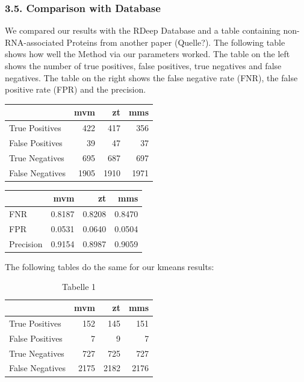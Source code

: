 \documentclass[
  12pt,
]{article}
\begin{document}
\hypertarget{comparison-with-database}{%
\subsubsection{3.5. Comparison with
Database}\label{comparison-with-database}}

We compared our results with the RDeep Database and a table containing
non-RNA-associated Proteins from another paper (Quelle?). The following
table shows how well the Method via our parameters worked. The table on
the left shows the number of true positives, false positives, true
negatives and false negatives. The table on the right shows the false
negative rate (FNR), the false positive rate (FPR) and the precision.

\begin{table}
\centering
\begin{tabular}{l|r|r|r}
\hline
  & mvm & zt & mms\\
\hline
True Positives & 422 & 417 & 356\\
\hline
False Positives & 39 & 47 & 37\\
\hline
True Negatives & 695 & 687 & 697\\
\hline
False Negatives & 1905 & 1910 & 1971\\
\hline
\end{tabular}
\end{table}

\begin{table}
\centering
\begin{tabular}{l|r|r|r}
\hline
  & mvm & zt & mms\\
\hline
FNR & 0.8187 & 0.8208 & 0.8470\\
\hline
FPR & 0.0531 & 0.0640 & 0.0504\\
\hline
Precision & 0.9154 & 0.8987 & 0.9059\\
\hline
\end{tabular}
\end{table}

The following tables do the same for our kmeans results:

\begin{table}

\caption{\label{tab:unnamed-chunk-7}Tabelle 1}
\centering
\begin{tabular}[t]{l|r|r|r}
\hline
  & mvm & zt & mms\\
\hline
True Positives & 152 & 145 & 151\\
\hline
False Positives & 7 & 9 & 7\\
\hline
True Negatives & 727 & 725 & 727\\
\hline
False Negatives & 2175 & 2182 & 2176\\
\hline
\end{tabular}
\end{table}
\end{document}
